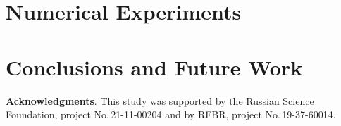 \documentclass{svproc}
\begin{document}

\section{Numerical Experiments}\label{Sec_Exp}




\section{Conclusions and Future Work}



\medskip

\textbf{Acknowledgments}. This study was supported by the Russian Science Foundation, project No.\,21-11-00204 and by RFBR, project No.\,19-37-60014.

%
%

{}
\end{document}
